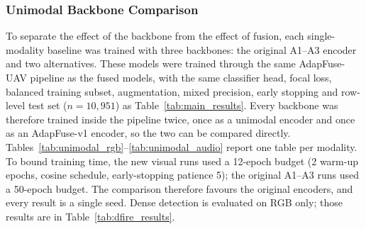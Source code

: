 \documentclass[journal]{IEEEtran}
\begin{document}
\subsubsection{Unimodal Backbone Comparison}
\label{sec:unimodal_backbones}

To separate the effect of the backbone from the effect of fusion, each single-modality baseline was trained with three backbones: the original A1--A3 encoder and two alternatives. These models were trained through the same AdapFuse-UAV pipeline as the fused models, with the same classifier head, focal loss, balanced training subset, augmentation, mixed precision, early stopping and row-level test set ($n=10{,}951$) as Table~\ref{tab:main_results}. Every backbone was therefore trained inside the pipeline twice, once as a unimodal encoder and once as an AdapFuse-v1 encoder, so the two can be compared directly. Tables~\ref{tab:unimodal_rgb}--\ref{tab:unimodal_audio} report one table per modality. To bound training time, the new visual runs used a 12-epoch budget (2 warm-up epochs, cosine schedule, early-stopping patience 5); the original A1--A3 runs used a 50-epoch budget. The comparison therefore favours the original encoders, and every result is a single seed. Dense detection is evaluated on RGB only; those results are in Table~\ref{tab:dfire_results}.

\begin{table}[!t]
\centering
\caption[RGB-only scene classification]{RGB-only scene classification with three backbones ($n=10{,}951$). Epochs: run / budget. Best in bold.}
\label{tab:unimodal_rgb}
\end{table}
\end{document}
